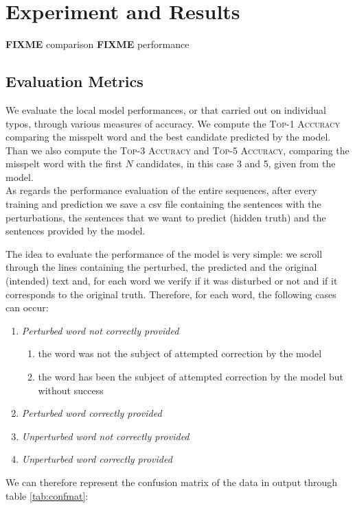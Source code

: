 \chapter{Experiment and Results}

\textbf{FIXME} comparison
\textbf{FIXME} performance

\section{Evaluation Metrics}
We evaluate the local model performances, or that carried out on individual typos, through various measures of 
accuracy. 
We compute the \textsc{Top-1 Accuracy} comparing the misspelt word and the best candidate predicted by the 
model. 
Than we also compute the \textsc{Top-3 Accuracy} and \textsc{Top-5 Accuracy}, comparing the misspelt word 
with the first $N$ candidates, in this case \num{3} and \num{5}, given from the model.\\


As regards the performance evaluation of the entire sequences, after every training and prediction we save a csv 
file containing the sentences with the perturbations, the sentences that we want to predict (hidden truth) and the 
sentences provided by the model.

The idea to evaluate the performance of the model is very simple: we scroll through the lines containing the 
perturbed, the predicted and the original (intended) text and, for each word we verify if it was disturbed or not and 
if it corresponds to the original truth.
Therefore, for each word, the following cases can occur:
\begin{enumerate}
	\item \textit{Perturbed word not correctly provided}
	\begin{enumerate}
		\item the word was not the subject of attempted correction by the model
		\item the word has been the subject of attempted correction by the model but without success
	\end{enumerate}
	\item \textit{Perturbed word correctly provided}
	\item \textit{Unperturbed word not correctly provided}
	\item \textit{Unperturbed word correctly provided}
\end{enumerate}

We can therefore represent the confusion matrix of the data in output through table \ref{tab:confmat}:

